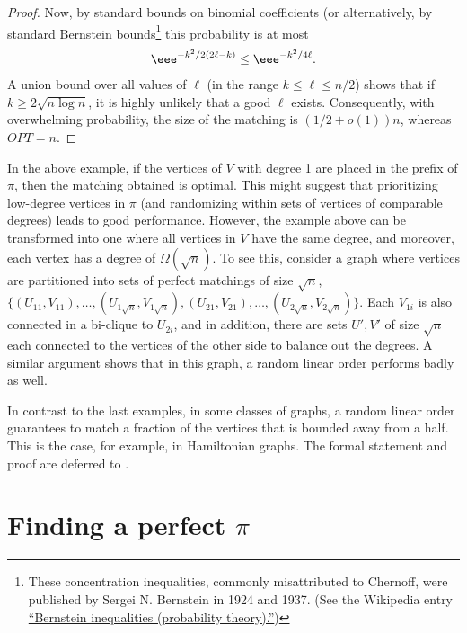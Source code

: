 \begin{proof}
Now, by standard bounds on binomial coefficients (or alternatively, by standard
%
Bernstein bounds\footnote{These concentration inequalities, 
commonly misattributed to Chernoff, were published by 
Sergei N. Bernstein in 1924 and 1937. (See the Wikipedia
entry
\href{https://en.wikipedia.org/wiki/Bernstein_inequalities_(probability_theory)}{%
``Bernstein inequalities (probability theory).''})}
this probability is at most 
	\begin{eqnarray}
		\eee^{-k^2/2(2\ell-k)} \le \eee^{-k^2/4\ell}.
	\end{eqnarray}
	A union bound over all values of $\ell$ (in the range
%
$k \le \ell \le n/2$)   %
shows that if $k \ge 2\sqrt{n\log n}$, it is highly unlikely that a good $\ell$ exists. Consequently, with overwhelming probability, the size of the matching is $(1/2 +o(1))n$, whereas $OPT=n$.
\end{proof}



In the above example, if the vertices of $V$ with degree 1 are placed in the prefix of $\pi$, then the %
matching obtained  %
is optimal. This might suggest that prioritizing
%
low-degree   %
vertices in $\pi$ (and randomizing within sets of vertices of comparable degrees) leads to good performance.
However, the example above can be transformed into one where all vertices in $V$ have the same degree, and moreover, each vertex has a degree of $\Omega(\sqrt{n})$.
To see this, consider a graph where vertices are partitioned into sets of perfect matchings of size $\sqrt{n}$, $\{(U_{11},V_{11}),\ldots, (U_{1\sqrt{n}},V_{1\sqrt{n}}), (U_{21},V_{21}),\ldots, (U_{2\sqrt{n}},V_{2\sqrt{n}})\}$. Each $V_{1i}$ is also connected in a bi-clique to $U_{2i}$, and in addition, there are sets $U',V'$ of size $\sqrt{n}$ each connected to the vertices of the other side to balance out the degrees. A similar argument shows that in this graph, a random linear order performs badly as well. 

In contrast to the last examples, in some classes of graphs, a random linear order guarantees to match a fraction of the vertices that is bounded away from a half.
This is the case, for example, in Hamiltonian graphs.
The formal statement and proof are deferred to .


%
\section{Finding a perfect \texorpdfstring{$\pi$}{pi}}   %
%
\label{sec:perfect-pi}

